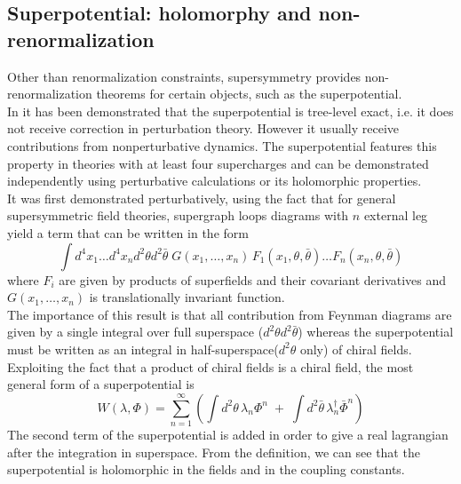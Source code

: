 \subsection{Superpotential: holomorphy and non-renormalization}
\label{sec:superpotential_hol_renorm}

Other than renormalization constraints, supersymmetry provides non-renormalization theorems for certain objects, such as the superpotential. 
\\
In \cite{Grisaru:1979wc} it has been demonstrated that the superpotential is tree-level exact, i.e. it does not receive correction in perturbation theory. 
However it usually receive contributions from nonperturbative dynamics.
The superpotential features this property in theories with at least four supercharges and can be demonstrated independently using perturbative calculations or its holomorphic properties. 
\\
It was first demonstrated perturbatively, using the fact that for general supersymmetric field theories, supergraph loops diagrams with $n$ external leg yield a term that can be written in the form
\begin{equation}
\int  d^4 x_1 \dots d^4 x_n d^2 \theta d^2 \bar{\theta} \; G (x_1 , \dots , x_n) \,F_1 ( x_1, \theta, \bar{\theta}) \dots  F_n ( x_n, \theta, \bar{\theta}) 
\end{equation} 
where $F_i$ are given by products of superfields and their covariant derivatives and $G (x_1 , \dots , x_n) $ is translationally invariant function.\\
The importance of this result is that all contribution from Feynman diagrams are given by a single integral over full superspace ($d^2 \theta d^2 \bar{\theta} $) whereas the superpotential must be written as an integral in half-superspace($d^2 \theta $ only) of chiral fields.
Exploiting the fact that a product of chiral fields is a chiral field, the most general form of a superpotential is 
\begin{equation}
 W (\lambda, \Phi) = \sum_{n=1}^{\infty} \left( \int d^2 \theta \, \lambda_n \Phi^n  \; +\;  \int d^2 \bar{\theta} \, \lambda_n^{\dagger} \bar{\Phi}^n \right)
 \end{equation} 
 The second term of the superpotential is added in order to give a real lagrangian after the integration in superspace.
From the definition, we can see that the superpotential is holomorphic in the fields and in the coupling constants.
\\
